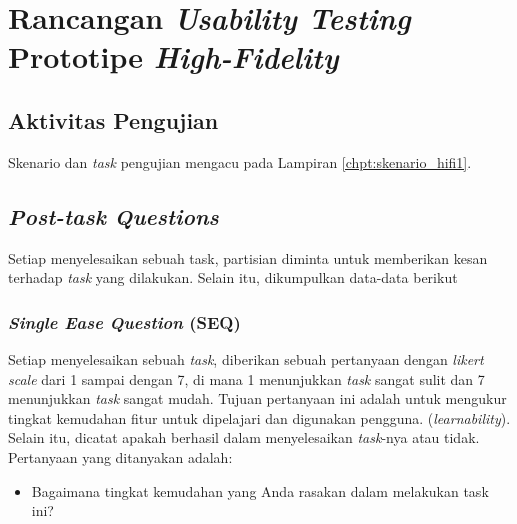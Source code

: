 \chapter{Rancangan \textit{Usability Testing} Prototipe \textit{High-Fidelity}}
\label{chpt:testing_hifi}

\newlength{\coln}
\setlength{\coln}{0.02\textwidth}

\newcommand{\apghead}[1]{\cellcolor[HTML]{A3E5F5}\textbf{#1}}
\newcommand{\apgheadcell}[1]{\multicolumn{1}{c|}{\apghead{#1}}}

\newcommand{\borderblue}{\arrayrulecolor[HTML]{A3E5F5}}
\newcommand{\borderblack}{\arrayrulecolor{black}}


\section{Aktivitas Pengujian}
Skenario dan \textit{task} pengujian mengacu pada Lampiran \ref{chpt:skenario_hifi1}.

\section{\textit{Post-task Questions}}

Setiap menyelesaikan sebuah task, partisian diminta untuk memberikan kesan terhadap \textit{task} yang dilakukan. Selain itu, dikumpulkan data-data berikut

\subsection{\textit{Single Ease Question} (SEQ)}

Setiap menyelesaikan sebuah \textit{task}, diberikan sebuah pertanyaan dengan \textit{likert scale} dari 1 sampai dengan 7, di mana 1 menunjukkan \textit{task} sangat sulit dan 7 menunjukkan \textit{task} sangat mudah. Tujuan pertanyaan ini adalah untuk mengukur tingkat kemudahan fitur untuk dipelajari dan digunakan pengguna. (\textit{learnability}). Selain itu, dicatat apakah berhasil dalam menyelesaikan \textit{task}-nya atau tidak. Pertanyaan yang ditanyakan adalah:

\begin{itemize}
  \item Bagaimana tingkat kemudahan yang Anda rasakan dalam melakukan task ini?
\end{itemize}




